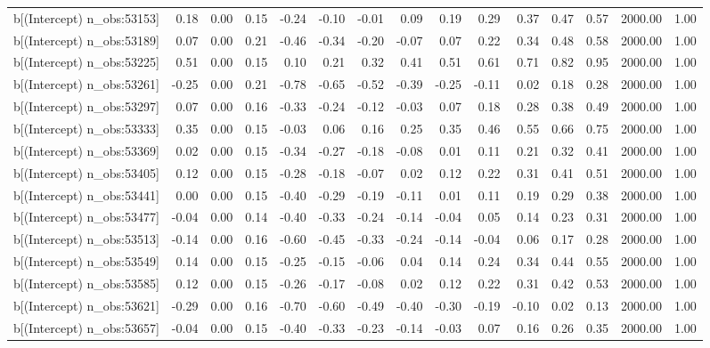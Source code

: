 \begin{table}[ht]
\begin{tabular}{rrrrrrrrrrrrrrr}
  b[(Intercept) n\_obs:53153] & 0.18 & 0.00 & 0.15 & -0.24 & -0.10 & -0.01 & 0.09 & 0.19 & 0.29 & 0.37 & 0.47 & 0.57 & 2000.00 & 1.00 \\ 
  b[(Intercept) n\_obs:53189] & 0.07 & 0.00 & 0.21 & -0.46 & -0.34 & -0.20 & -0.07 & 0.07 & 0.22 & 0.34 & 0.48 & 0.58 & 2000.00 & 1.00 \\ 
  b[(Intercept) n\_obs:53225] & 0.51 & 0.00 & 0.15 & 0.10 & 0.21 & 0.32 & 0.41 & 0.51 & 0.61 & 0.71 & 0.82 & 0.95 & 2000.00 & 1.00 \\ 
  b[(Intercept) n\_obs:53261] & -0.25 & 0.00 & 0.21 & -0.78 & -0.65 & -0.52 & -0.39 & -0.25 & -0.11 & 0.02 & 0.18 & 0.28 & 2000.00 & 1.00 \\ 
  b[(Intercept) n\_obs:53297] & 0.07 & 0.00 & 0.16 & -0.33 & -0.24 & -0.12 & -0.03 & 0.07 & 0.18 & 0.28 & 0.38 & 0.49 & 2000.00 & 1.00 \\ 
  b[(Intercept) n\_obs:53333] & 0.35 & 0.00 & 0.15 & -0.03 & 0.06 & 0.16 & 0.25 & 0.35 & 0.46 & 0.55 & 0.66 & 0.75 & 2000.00 & 1.00 \\ 
  b[(Intercept) n\_obs:53369] & 0.02 & 0.00 & 0.15 & -0.34 & -0.27 & -0.18 & -0.08 & 0.01 & 0.11 & 0.21 & 0.32 & 0.41 & 2000.00 & 1.00 \\ 
  b[(Intercept) n\_obs:53405] & 0.12 & 0.00 & 0.15 & -0.28 & -0.18 & -0.07 & 0.02 & 0.12 & 0.22 & 0.31 & 0.41 & 0.51 & 2000.00 & 1.00 \\ 
  b[(Intercept) n\_obs:53441] & 0.00 & 0.00 & 0.15 & -0.40 & -0.29 & -0.19 & -0.11 & 0.01 & 0.11 & 0.19 & 0.29 & 0.38 & 2000.00 & 1.00 \\ 
  b[(Intercept) n\_obs:53477] & -0.04 & 0.00 & 0.14 & -0.40 & -0.33 & -0.24 & -0.14 & -0.04 & 0.05 & 0.14 & 0.23 & 0.31 & 2000.00 & 1.00 \\ 
  b[(Intercept) n\_obs:53513] & -0.14 & 0.00 & 0.16 & -0.60 & -0.45 & -0.33 & -0.24 & -0.14 & -0.04 & 0.06 & 0.17 & 0.28 & 2000.00 & 1.00 \\ 
  b[(Intercept) n\_obs:53549] & 0.14 & 0.00 & 0.15 & -0.25 & -0.15 & -0.06 & 0.04 & 0.14 & 0.24 & 0.34 & 0.44 & 0.55 & 2000.00 & 1.00 \\ 
  b[(Intercept) n\_obs:53585] & 0.12 & 0.00 & 0.15 & -0.26 & -0.17 & -0.08 & 0.02 & 0.12 & 0.22 & 0.31 & 0.42 & 0.53 & 2000.00 & 1.00 \\ 
  b[(Intercept) n\_obs:53621] & -0.29 & 0.00 & 0.16 & -0.70 & -0.60 & -0.49 & -0.40 & -0.30 & -0.19 & -0.10 & 0.02 & 0.13 & 2000.00 & 1.00 \\ 
  b[(Intercept) n\_obs:53657] & -0.04 & 0.00 & 0.15 & -0.40 & -0.33 & -0.23 & -0.14 & -0.03 & 0.07 & 0.16 & 0.26 & 0.35 & 2000.00 & 1.00 \\ 

\end{tabular}
\end{table}
